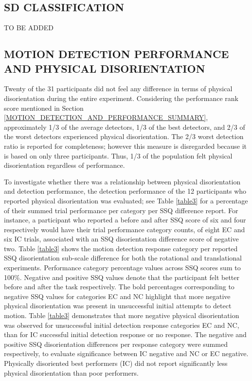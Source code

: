 \documentclass{ieeeaccess}
\begin{document}
\subsection{SD CLASSIFICATION}
TO BE ADDED


\subsection{MOTION DETECTION PERFORMANCE AND PHYSICAL DISORIENTATION}
Twenty of the 31 participants did not feel any difference in terms of physical disorientation during the entire experiment. Considering the performance rank score mentioned in Section \ref{MOTION_DETECTION_AND_PERFORMANCE_SUMMARY}, approximately 1/3 of the average detectors, 1/3 of the best detectors, and 2/3 of the worst detectors experienced physical disorientation. The 2/3 worst detection ratio is reported for completeness; however this measure is disregarded because it is based on only three participants. Thus, 1/3 of the population felt physical disorientation regardless of performance.

\indent To investigate whether there was a relationship between physical disorientation and detection performance, the detection performance of the 12 participants who reported physical disorientation was evaluated; see Table \ref{table3} for a percentage of their summed trial performance per category per SSQ difference report. For instance, a participant who reported a before and after SSQ score of six and four respectively would have their trial performance category counts, of eight EC and six IC trials, associated with an SSQ disorientation difference score of negative two. Table \ref{table3} shows the motion detection response category per reported SSQ disorientation sub-scale difference for both the rotational and translational experiments. Performance category percentage values across SSQ scores sum to 100\%. Negative and positive SSQ values denote that the participant felt better before and after the task respectively. The bold percentages corresponding to negative SSQ values for categories EC and NC highlight that more negative physical disorientation was present in unsuccessful initial attempts to detect motion. Table \ref{table3} demonstrates that more negative physical disorientation was observed for unsuccessful initial detection response categories EC and NC, than for IC successful initial detection response or no response. The negative and positive SSQ disorientation differences per response category were summed respectively, to evaluate significance between IC negative and NC or EC negative. Physically disoriented best performers (IC) did not report significantly less physical disorientation than poor performers.
\end{document}
